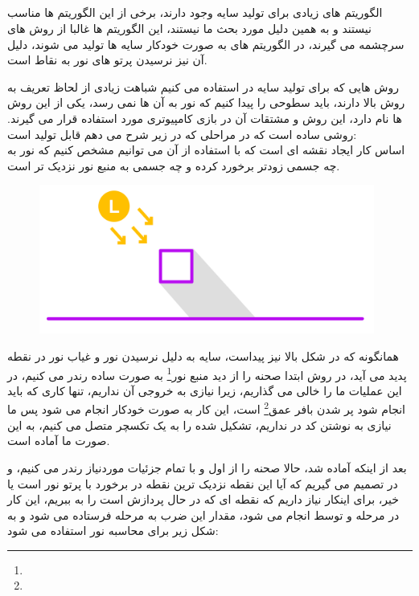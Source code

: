 \documentclass[a4paper, 12pt]{report}
\begin{document}
\newpage

\subsection{}
    الگوریتم های زیادی برای تولید سایه وجود دارند، برخی از این الگوریتم ها مناسب  نیستند و به همین دلیل مورد بحث ما نیستند، این الگوریتم ها غالبا از روش های  سرچشمه می گیرند، در الگوریتم های  به صورت خودکار سایه ها تولید می شوند، دلیل آن نیز نرسیدن پرتو های نور به نقاط است.\par
    روش هایی که برای تولید سایه در  استفاده می کنیم شباهت زیادی از لحاظ تعریف به روش بالا دارند، باید سطوحی را پیدا کنیم که نور به آن ها نمی رسد، یکی از این روش ها  نام دارد، این روش و مشتقات آن در بازی کامپیوتری مورد استفاده قرار می گیرند.  روشی ساده است که در مراحلی که در زیر شرح می دهم قابل تولید است:\\ اساس کار ایجاد نقشه ای است که با استفاده از آن می توانیم مشخص کنیم که نور به چه جسمی زودتر برخورد کرده و چه جسمی به منبع نور نزدیک تر است.

\begin{figure}[H]
    \centering
    \href{https://github.com/devprofile98/shm}{
        \includegraphics[width=11cm]{images/shadow.png}
    }
    \caption{\fontsize{11pt}{1.0cm}\zarbold\textbf{}}
    \label{fig:my_label}
\end{figure}

    همانگونه که در شکل بالا نیز پیداست، سایه به دلیل نرسیدن نور و غیاب نور در نقطه پدید می آید، در روش  ابتدا صحنه را از دید منبع نور\footnote{} به صورت ساده رندر می کنیم، در این عملیات ما  را خالی می گذاریم، زیرا نیازی به خروجی آن نداریم، تنها کاری که باید انجام شود پر شدن بافر عمق\footnote{} است، این کار به صورت خودکار انجام می شود پس ما نیازی به نوشتن کد در  نداریم،  تشکیل شده را به یک تکسچر متصل می کنیم، به این صورت  ما آماده است.\par
    بعد از اینکه  آماده شد، حالا صحنه را از اول و با تمام جزئیات موردنیاز رندر می کنیم، و در  تصمیم می گیریم که آیا این نقطه نزدیک ترین نقطه در برخورد با پرتو نور است یا خیر، برای اینکار نیاز داریم که نقطه ای که در حال پردازش است را به  ببریم، این کار در مرحله  و توسط  انجام می شود، مقدار این ضرب به مرحله  فرستاده می شود و به شکل زیر برای محاسبه نور استفاده می شود:
\end{document}

